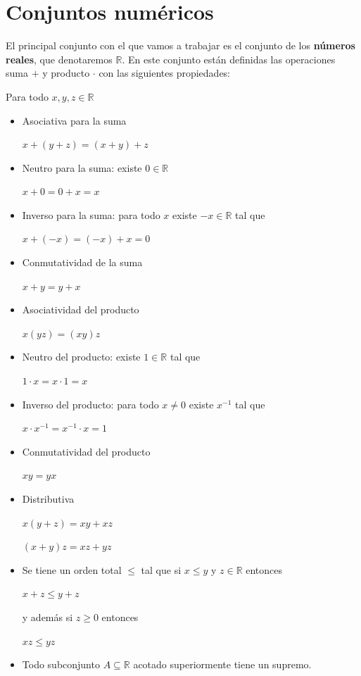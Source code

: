 \section{Conjuntos numéricos}

\begin{definition} 
El principal conjunto con el que vamos a trabajar es el conjunto de los \textbf{números reales}, que denotaremos $\mathbb{R}$.  En este conjunto están definidas las operaciones suma $+$ y producto $\cdot$ con las siguientes propiedades:

Para todo $x,y,z \in \mathbb{R}$

\begin{itemize}

\item Asociativa para la suma

$x+(y+z) = (x+y)+z$

\item Neutro para la suma: existe $0 \in \mathbb{R}$

$x+0 = 0+x = x$

\item Inverso para la suma: para todo $x$ existe $-x \in \mathbb{R}$ tal que

$x + (-x) = (-x) + x = 0$

\item Conmutatividad de la suma

$x+y = y+x$

\item Asociatividad del producto

$x(yz) = (xy)z$

\item Neutro del producto: existe $1 \in \mathbb{R}$ tal que

$1 \cdot x = x \cdot 1 = x$

\item Inverso del producto: para todo $x \neq 0$ existe $x^{-1}$ tal que

$x \cdot x^{-1} = x^{-1} \cdot x = 1$

\item Conmutatividad del producto

$xy = yx$

\item Distributiva

$x(y+z) = xy + xz$

$(x+y)z = xz + yz$

\item Se tiene un orden total $\leq$ tal que si $x \leq y$ y $z \in \mathbb{R}$ entonces

$x+z \leq y+z$

y además si $z \geq 0$ entonces

$xz \leq yz$ 

\item Todo subconjunto $A \subseteq \mathbb{R}$ acotado superiormente tiene un supremo.

\end{itemize}
\end{definition}

